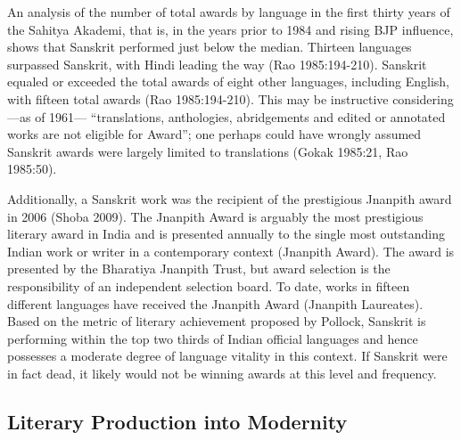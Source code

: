An analysis of the number of total awards by language in the first thirty years of the Sahitya Akademi, that is, in the years prior to 1984 and rising BJP influence, shows that Sanskrit performed just below the median. Thirteen languages surpassed Sanskrit, with Hindi leading the way (Rao 1985:194-210). Sanskrit equaled or exceeded the total awards of eight other languages, including English, with fifteen total awards (Rao 1985:194-210). This may be instructive considering—as of 1961— “translations, anthologies, abridgements and edited or annotated works are not eligible for Award”; one perhaps could have wrongly assumed Sanskrit awards were largely limited to translations (Gokak 1985:21, Rao 1985:50). 

Additionally, a Sanskrit work was the recipient of the prestigious Jnanpith award in 2006 (Shoba 2009). The Jnanpith Award is arguably the most prestigious literary award in India and is presented annually to the single most outstanding Indian work or writer in a contemporary context (Jnanpith Award). The award is presented by the Bharatiya Jnanpith Trust, but award selection is the responsibility of an independent selection board. To date, works in fifteen different languages have received the Jnanpith Award (Jnanpith Laureates). Based on the metric of literary achievement proposed by Pollock, Sanskrit is performing within the top two thirds of Indian official languages and hence possesses a moderate degree of language vitality in this context. If Sanskrit were in fact dead, it likely would not be winning awards at this level and frequency. 
\vskip -20pt

\subsection*{Literary Production into Modernity}
\vskip -4pt

